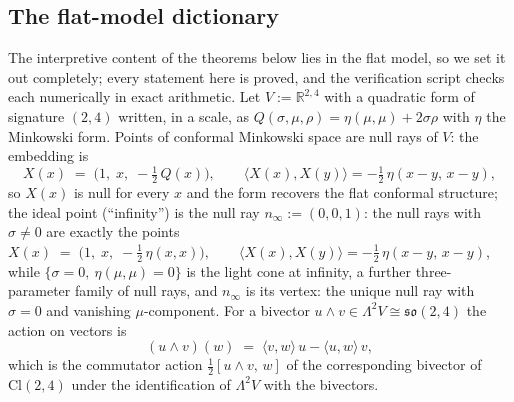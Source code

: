 \documentclass[11pt]{article}
\theoremstyle{definition}
\theoremstyle{plain}
\providecommand{\Cl}{}\renewcommand{\Cl}{\mathrm{Cl}}
\providecommand{\R}{}\renewcommand{\R}{\mathbb{R}}
\providecommand{\nInf}{}\renewcommand{\nInf}{n_\infty}
\providecommand{\ip}{}\renewcommand{\ip}[2]{\langle #1, #2\rangle}
\begin{document}
\subsection*{The flat-model dictionary}
\label{c:note.interior.setting-flat-model-dictionary}
The interpretive content of the theorems below lies in the flat model, so we set it out completely; every statement here is proved, and the verification script checks each numerically in exact arithmetic. Let $V := \R^{2,4}$ with a quadratic form of signature $(2,4)$ written, in a scale, as $Q(\sigma,\mu,\rho) = \eta(\mu,\mu) + 2\sigma\rho$ with $\eta$ the Minkowski form. Points of conformal Minkowski space are null rays of $V$: the embedding is
\begin{equation}
X(x) \;=\; \bigl(1,\; x,\; -\tfrac12\,Q(x)\bigr), \qquad
\ip{X(x)}{X(y)} = -\tfrac12\,\eta(x - y,\, x - y),
\end{equation}
so $X(x)$ is null for every $x$ and the form recovers the flat conformal structure; the ideal point (``infinity'') is the null ray $\nInf := (0, 0, 1)$: the null rays with $\sigma \neq 0$ are exactly the points $X(x) \;=\; \bigl(1,\; x,\; -\tfrac12\,\eta(x,x)\bigr), \qquad \ip{X(x)}{X(y)} = -\tfrac12\,\eta(x - y,\, x - y)$, while $\{\sigma = 0,\ \eta(\mu,\mu) = 0\}$ is the light cone at infinity, a further three-parameter family of null rays, and $\nInf$ is its vertex: the unique null ray with $\sigma = 0$ and vanishing $\mu$-component. For a bivector $u \wedge v \in \Lambda^2 V \cong \mathfrak{so}(2,4)$ the action on vectors is
\begin{equation}
(u \wedge v)(w) \;=\; \ip{v}{w}\,u - \ip{u}{w}\,v ,
\end{equation}
which is the commutator action $\tfrac12[u\wedge v,\, w]$ of the corresponding bivector of $\Cl(2,4)$ under the identification of $\Lambda^2 V$ with the bivectors.
\end{document}
